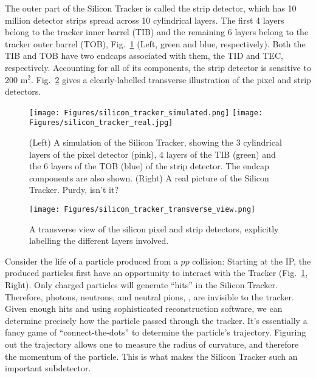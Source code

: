 The outer part of the Silicon Tracker is called the strip detector, which has 10 million detector strips spread across 10 cylindrical layers.
The first 4 layers belong to the tracker inner barrel (TIB) and the remaining 6 layers belong to the tracker outer barrel (TOB), Fig.~\ref{fig:tracker_real} (Left, green and blue, respectively). 
Both the TIB and TOB have two endcaps associated with them, the TID and TEC, respectively.
Accounting for all of its components, the strip detector is sensitive to 200 m$^2$.
Fig.~\ref{fig:tracker_xs} gives a clearly-labelled transverse illustration of the pixel and strip detectors.
\begin{figure}[pbth]
\centering
\texttt{[image: Figures/silicon\_tracker\_simulated.png]}
\texttt{[image: Figures/silicon\_tracker\_real.jpg]}
    \caption{
    (Left) A simulation of the Silicon Tracker, showing the 3 cylindrical layers of the pixel detector (pink), 4 layers of the TIB (green) and the 6 layers of the TOB (blue) of the strip detector.
    The endcap components are also shown.
    (Right) A real picture of the Silicon Tracker. Purdy, isn't it?} 
    \label{fig:tracker_real}
\end{figure}
\begin{figure}[pbth]
\centering
\texttt{[image: Figures/silicon\_tracker\_transverse\_view.png]}
    \caption{A transverse view of the silicon pixel and strip detectors, explicitly labelling the different layers involved.}
    \label{fig:tracker_xs}
\end{figure}

Consider the life of a particle produced from a $pp$ collision:
Starting at the IP, the produced particles first have an opportunity to interact with the Tracker (Fig.~\ref{fig:tracker_real}, Right).
Only charged particles will generate ``hits'' in the Silicon Tracker.
Therefore, photons, neutrons, and neutral pions, \eg, are invisible to the tracker.
Given enough hits and using sophisticated reconstruction software, we can determine precisely how the particle passed through the tracker.
It's essentially a fancy game of ``connect-the-dots'' to determine the particle's trajectory.
Figuring out the trajectory allows one to measure the radius of curvature, and therefore the momentum of the particle.
This is what makes the Silicon Tracker such an important subdetector.

